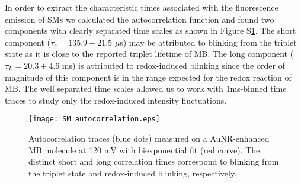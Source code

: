 \documentclass[11pt,a4paper,onecolumn]{article}
\newcommand*\commentauthor[1]{\textbf{{\textit{#1}}}}
\newcommand*\me[1]{\ensuremath{\bar{#1}\,}}
\begin{document}
In order to extract the characteristic times associated with the fluorescence emission of SMs we calculated the autocorrelation function and found two components with clearly separated time scales as shown in Figure S\ref{fg:ACF}.
The short component ($\tau_s = 135.9 \pm 21.5$ $\mu$s) may be attributed to blinking from the triplet state as it is close to the reported triplet lifetime of MB. \cite{Murovhandbook} %
The long component ($\tau_L = 20.3 \pm 4.6$ ms) is attributed to redox-induced blinking since the order of magnitude of this component is in the range expected for the redox reaction of MB.\cite{kinetics_ascorbic,kinetics_ferro}
 The well separated time scales allowed us to work with 1ms-binned time traces to study only the redox-induced intensity fluctuations.

\begin{figure}
  \centering
  \texttt{[image: SM\_autocorrelation.eps]}
	\makeatletter
	\renewcommand{\fnum@figure}{\figurename~S\thefigure}
	\makeatother
  \caption{Autocorrelation traces (blue dots) measured on a AuNR-enhanced MB molecule at 120 mV with biexponential fit (red curve). The distinct short and long correlation times correspond to blinking from the triplet state and redox-induced blinking, respectively.
	}
  \label{fg:ACF}
\end{figure}
\end{document}
